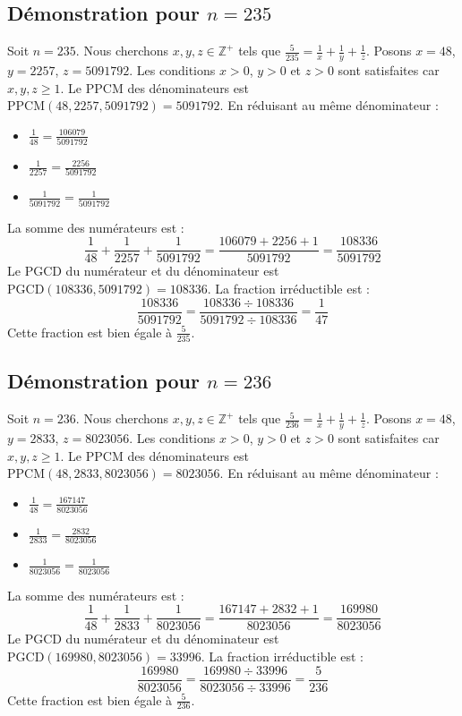 \documentclass[11pt,a4paper]{article}
\begin{document}
\subsection{Démonstration pour $n = 235$}
Soit $n = 235$. Nous cherchons $x, y, z \in \mathbb{Z}^{+}$ tels que $\frac{5}{235} = \frac{1}{x} + \frac{1}{y} + \frac{1}{z}$.
Posons $x = 48$, $y = 2257$, $z = 5091792$.
Les conditions $x > 0$, $y > 0$ et $z > 0$ sont satisfaites car $x, y, z \geq 1$.
Le PPCM des dénominateurs est $\text{PPCM}(48, 2257, 5091792) = 5091792$.
En réduisant au même dénominateur :
\begin{itemize}
    \item $\frac{1}{48} = \frac{106079}{5091792}$
    \item $\frac{1}{2257} = \frac{2256}{5091792}$
    \item $\frac{1}{5091792} = \frac{1}{5091792}$
\end{itemize}
La somme des numérateurs est :
$$ \frac{1}{48} + \frac{1}{2257} + \frac{1}{5091792} = \frac{106079 + 2256 + 1}{5091792} = \frac{108336}{5091792} $$
Le PGCD du numérateur et du dénominateur est $\text{PGCD}(108336, 5091792) = 108336$.
La fraction irréductible est :
$$ \frac{108336}{5091792} = \frac{108336 \div 108336}{5091792 \div 108336} = \frac{1}{47} $$
Cette fraction est bien égale à $\frac{5}{235}$.

\subsection{Démonstration pour $n = 236$}
Soit $n = 236$. Nous cherchons $x, y, z \in \mathbb{Z}^{+}$ tels que $\frac{5}{236} = \frac{1}{x} + \frac{1}{y} + \frac{1}{z}$.
Posons $x = 48$, $y = 2833$, $z = 8023056$.
Les conditions $x > 0$, $y > 0$ et $z > 0$ sont satisfaites car $x, y, z \geq 1$.
Le PPCM des dénominateurs est $\text{PPCM}(48, 2833, 8023056) = 8023056$.
En réduisant au même dénominateur :
\begin{itemize}
    \item $\frac{1}{48} = \frac{167147}{8023056}$
    \item $\frac{1}{2833} = \frac{2832}{8023056}$
    \item $\frac{1}{8023056} = \frac{1}{8023056}$
\end{itemize}
La somme des numérateurs est :
$$ \frac{1}{48} + \frac{1}{2833} + \frac{1}{8023056} = \frac{167147 + 2832 + 1}{8023056} = \frac{169980}{8023056} $$
Le PGCD du numérateur et du dénominateur est $\text{PGCD}(169980, 8023056) = 33996$.
La fraction irréductible est :
$$ \frac{169980}{8023056} = \frac{169980 \div 33996}{8023056 \div 33996} = \frac{5}{236} $$
Cette fraction est bien égale à $\frac{5}{236}$.
\end{document}

